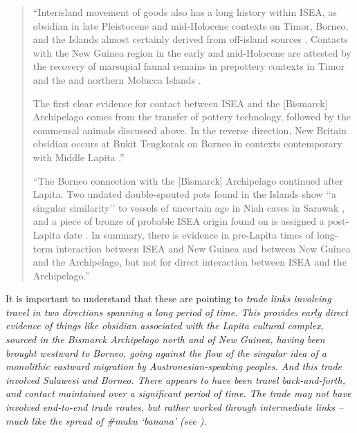 \begin{quote}
	``Interisland movement of goods also has a long history within ISEA,
	as obsidian in late Pleistocene
	and mid-Holocene contexts on Timor,
	Borneo, and the  Islands almost certainly derived from off-island sources
	\citep{AmbroseReepmeyer2009,Reepmeyer2011,Reepmeyer2011}.
	Contacts with the New Guinea region in the early
	and mid-Holocene are attested by the recovery of marsupial faunal remains in prepottery
	contexts in Timor and the  and northern Molucca Islands
	\citep{FlanneryNitihaminoto1995,FlanneryBalasubramaniam1998}.

	The first clear evidence for contact between ISEA
	and the [Bismarck] Archipelago comes from the transfer of pottery technology,
	followed by the commensal animals discussed above.
	In the reverse direction,
	New Britain obsidian occurs at Bukit Tengkorak on Borneo in contexts contemporary
	with Middle Lapita
	\citep{BellwoodKoon1989,Bird1989}.''
	\citep[116--117]{SpechtTerrell2014}

	``The Borneo connection with the [Bismarck] Archipelago continued after Lapita.
	Two undated double-spouted pots found in the  Islands show ‘‘a singular similarity’’
	\citep[p. 28]{Kennedy1982} to vessels of uncertain age in Niah caves in Sarawak \citep{Harrison1971},
	and a piece of bronze of probable ISEA origin found on
	 is assigned a post-Lapita date \citep{Ambrose1988}.
	In summary, there is evidence in pre-Lapita times of long-term interaction between
	ISEA and New Guinea and between New Guinea
	and the Archipelago, but not for direct interaction between ISEA and the Archipelago.''
	\citep[117]{SpechtTerrell2014} 
\end{quote}


It is important to understand that these are pointing to \it{trade} links involving
travel in two directions spanning a long period of time.
This provides early direct evidence of things like obsidian associated with the Lapita
cultural complex, sourced in the Bismarck Archipelago north
and  of New Guinea,
having been brought westward to Borneo,
going against the flow of the singular idea of a monolithic
eastward migration by Austronesian-speaking peoples.
And this trade involved Sulawesi and Borneo.
There appears to have been travel back-and-forth,
and contact maintained over a significant period of time.
The trade may not have involved end-to-end trade routes,
but rather worked through intermediate links -- much like the spread
of {\#}muku ‘banana’ (see ).

